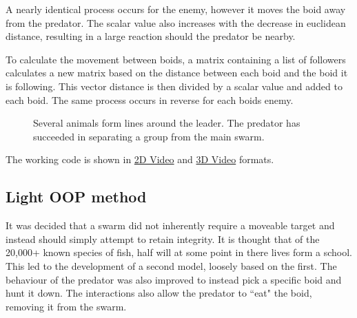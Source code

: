\documentclass[
reprint,
showpacs,preprintnumbers,
amsmath,amssymb,
prl,
]{revtex4-1}
\begin{document}
A nearly identical process occurs for the enemy, however it moves the boid away from the predator.
The scalar value also increases with the decrease in euclidean distance, resulting in a large reaction should the predator be nearby.

To calculate the movement between boids, a matrix containing a list of followers calculates a new matrix based on the distance between each boid and the boid it is following.
This vector distance is then divided by a scalar value and added to each boid.
The same process occurs in reverse for each boids enemy.

\begin{figure}[!htp]

	\caption{
		Several animals form lines around the leader.
		The predator has succeeded in separating a group from the main swarm.
	}

	\label{fig:animallines}
\end{figure}

The working code is shown in \href{https://youtu.be/EyhdRhi5Gnc}{2D Video} and \href{https://youtu.be/KG7qQum6EUc}{3D Video} formats.


\subsection{\label{sec:level2}Light OOP method}

It was decided that a swarm did not inherently require a moveable target and instead should simply attempt to retain integrity.
It is thought that of the 20,000+ known species of fish, half will at some point in there lives form a school.\cite{fishschools}
This led to the development of a second model, loosely based on the first.
The behaviour of the predator was also improved to instead pick a specific boid and hunt it down.
The interactions also allow the predator to ``eat" the boid, removing it from the swarm.
\end{document}
